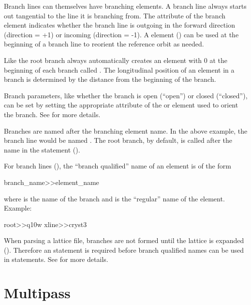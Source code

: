 Branch lines can themselves have branching elements. A branch line always
starts out tangential to the line it is branching from. The
 attribute of the branch element indicates whether the
branch line is outgoing in the forward direction (direction = +1) or
incoming (direction = -1). A  element () can
be used at the beginning of a branch line to reorient the reference
orbit as needed.

Like the root branch \bmad always automatically creates an element
with  0 at the beginning of each branch called
. The longitudinal  position of an element in a
branch is determined by the distance from the beginning of the branch.

Branch parameters, like whether the branch is open
(``open'') or closed (``closed''), can be set
by setting the appropriate attribute of the  or
 element used to orient the branch.
See  for more details.

Branches are named after the branching element name. In the above
example, the branch line would be named . The root branch, by
default, is called after the name in the  statement
().

For branch lines (), the ``branch
qualified'' name of an element is of the form
\begin{example}
  branch_name>>element_name
\end{example}
where  is the name of the branch and  is the
``regular'' name of the element. Example:
\begin{example}
  root>>q10w
  xline>>cryst3
\end{example}
When parsing a lattice
file, branches are not formed until the lattice is expanded
(). Therefore an  statement is
required before branch qualified names can be used in statements. 
See  for more details.

\section{Multipass}
\label{s:multipass}

